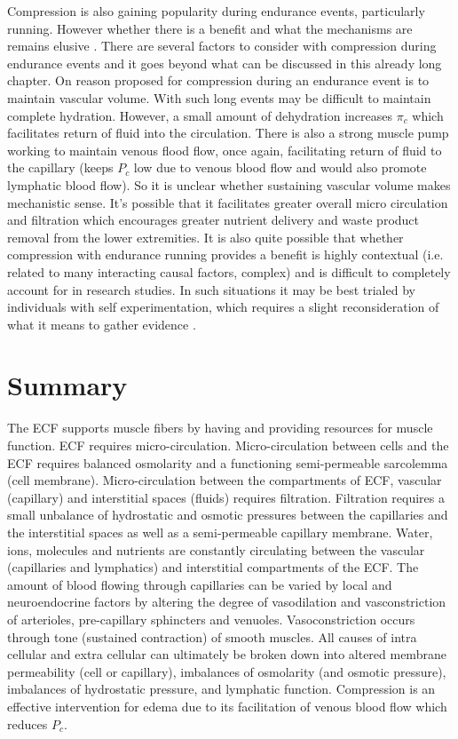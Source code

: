 Compression is also gaining popularity during endurance events, particularly running. However whether there is a benefit and what the mechanisms are remains elusive \cite{mota_effects_2020}. There are several factors to consider with compression during endurance events and it goes beyond what can be discussed in this already long chapter. On reason proposed for compression during an endurance event is to maintain vascular volume. With such long events may be difficult to maintain complete hydration. However, a small amount of dehydration increases $\pi_c$ which facilitates return of fluid into the circulation. There is also a strong muscle pump working to maintain venous flood flow, once again, facilitating return of fluid to the capillary (keeps $P_c$ low due to venous blood flow and would also promote lymphatic blood flow). So it is unclear whether sustaining vascular volume makes mechanistic sense. It's possible that it facilitates greater overall micro circulation and filtration which encourages greater nutrient delivery and waste product removal from the lower extremities. It is also quite possible that whether compression with endurance running provides a benefit is highly contextual (i.e. related to many interacting causal factors, complex) and is difficult to completely account for in research studies. In such situations it may be best trialed by individuals with self experimentation, which requires a slight reconsideration of what it means to gather evidence \cite{anjum2020rethinking}.

\section{Summary}

The ECF supports muscle fibers by having and providing resources for muscle function. ECF requires micro-circulation. Micro-circulation between cells and the ECF requires balanced osmolarity and a functioning semi-permeable sarcolemma (cell membrane). Micro-circulation between the compartments of ECF, vascular (capillary) and interstitial spaces (fluids) requires filtration. Filtration requires a small unbalance of hydrostatic and osmotic pressures between the capillaries and the interstitial spaces as well as a semi-permeable capillary membrane. Water, ions, molecules and nutrients are constantly circulating between the vascular (capillaries and lymphatics) and interstitial compartments of the ECF. 
The amount of blood flowing through capillaries can be varied by local and neuroendocrine factors by altering the degree of vasodilation and vasconstriction of arterioles, pre-capillary sphincters and venuoles. Vasoconstriction occurs through tone (sustained contraction) of smooth muscles. 
All causes of intra cellular and extra cellular can ultimately be broken down into altered membrane permeability (cell or capillary), imbalances of osmolarity (and osmotic pressure), imbalances of hydrostatic pressure, and lymphatic function. Compression is an effective intervention for edema due to its facilitation of venous blood flow which reduces $P_c$.


